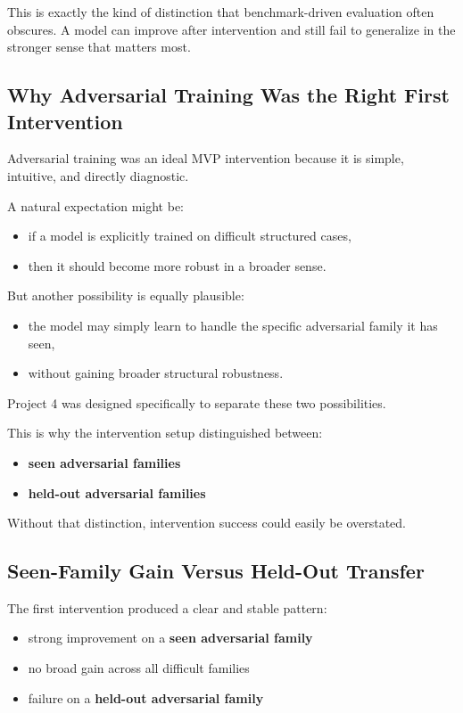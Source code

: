 \documentclass[11pt]{article}
\begin{document}
This is exactly the kind of distinction that benchmark-driven evaluation often obscures. A model can improve after intervention and still fail to generalize in the stronger sense that matters most.

\subsection{Why Adversarial Training Was the Right First Intervention}

Adversarial training was an ideal MVP intervention because it is simple, intuitive, and directly diagnostic.

A natural expectation might be:
\begin{itemize}[leftmargin=1.5em]
    \item if a model is explicitly trained on difficult structured cases,
    \item then it should become more robust in a broader sense.
\end{itemize}

But another possibility is equally plausible:
\begin{itemize}[leftmargin=1.5em]
    \item the model may simply learn to handle the specific adversarial family it has seen,
    \item without gaining broader structural robustness.
\end{itemize}

Project 4 was designed specifically to separate these two possibilities.

This is why the intervention setup distinguished between:
\begin{itemize}[leftmargin=1.5em]
    \item \textbf{seen adversarial families}
    \item \textbf{held-out adversarial families}
\end{itemize}

Without that distinction, intervention success could easily be overstated.

\subsection{Seen-Family Gain Versus Held-Out Transfer}

The first intervention produced a clear and stable pattern:
\begin{itemize}[leftmargin=1.5em]
    \item strong improvement on a \textbf{seen adversarial family}
    \item no broad gain across all difficult families
    \item failure on a \textbf{held-out adversarial family}
\end{itemize}
\end{document}

